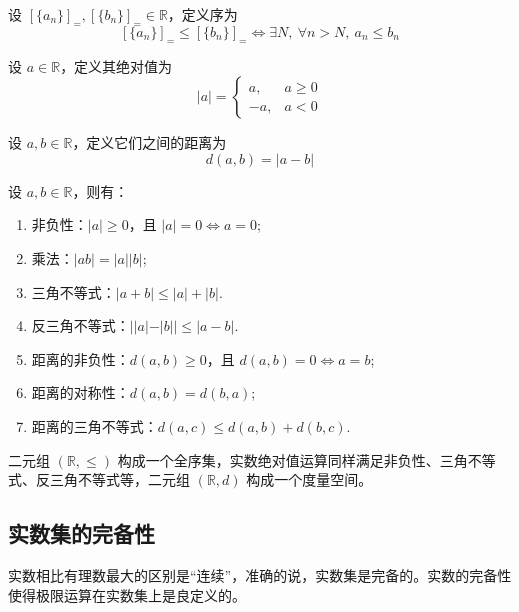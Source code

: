 \vspace{1em}

\begin{definition}
    设 $[\{a_n\}]_{=},[\{b_n\}]_{=}\in\mathbb{R}$，定义序为
    \[
        [\{a_n\}]_{=} \le [\{b_n\}]_{=} \iff \exists N,\ \forall n>N,\ a_n \le b_n
    \]
\end{definition}

\begin{definition}
    设 $a\in\mathbb{R}$，定义其绝对值为
    \[
        |a| = 
        \begin{cases}
            a, & a \ge 0 \\
            -a, & a < 0
        \end{cases}
    \]
\end{definition}

\begin{definition}
    设 $a,b\in\mathbb{R}$，定义它们之间的距离为
    \[
        d(a,b) = |a - b|
    \]
\end{definition}
\vspace{1em}

\begin{proposition}[实数绝对值的性质]
    设 $a,b\in\mathbb{R}$，则有：
    \begin{enumerate}
        \item 非负性：$|a| \ge 0$，且 $|a| = 0 \iff a = 0$;
        \item 乘法：$|ab| = |a||b|$;
        \item 三角不等式：$|a+b| \le |a| + |b|$.
        \item 反三角不等式：$||a| - |b|| \le |a - b|$.
        \item 距离的非负性：$d(a,b) \ge 0$，且 $d(a,b) = 0 \iff a = b$;
        \item 距离的对称性：$d(a,b) = d(b,a)$;
        \item 距离的三角不等式：$d(a,c) \le d(a,b) + d(b,c)$.
    \end{enumerate}
\end{proposition}

\begin{note}
    二元组 $(\mathbb{R},\le)$ 构成一个全序集，实数绝对值运算同样满足非负性、三角不等式、反三角不等式等，二元组 $(\mathbb{R},d)$ 构成一个度量空间。
\end{note}

\vspace{1em}
\subsection{实数集的完备性}
实数相比有理数最大的区别是“连续”，准确的说，实数集是完备的。实数的完备性使得极限运算在实数集上是良定义的。
\vspace{1em}

